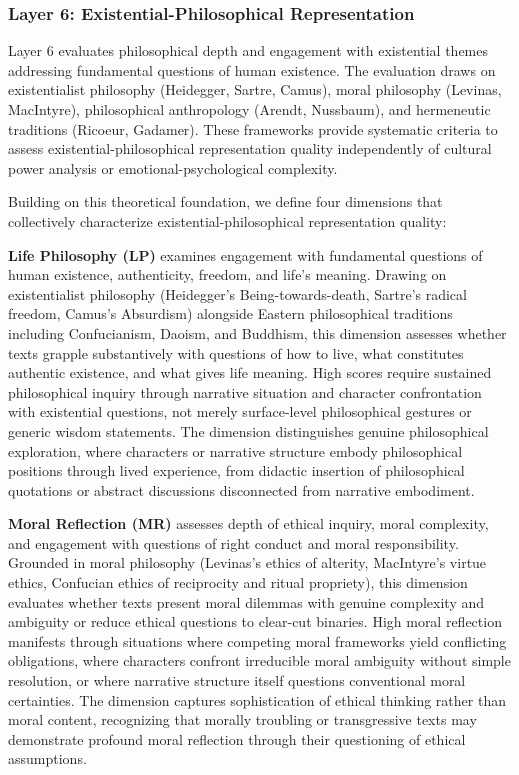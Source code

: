 \subsubsection{Layer 6: Existential-Philosophical Representation}

Layer 6 evaluates philosophical depth and engagement with existential themes addressing fundamental questions of human existence. The evaluation draws on existentialist philosophy (Heidegger, Sartre, Camus), moral philosophy (Levinas, MacIntyre), philosophical anthropology (Arendt, Nussbaum), and hermeneutic traditions (Ricoeur, Gadamer). These frameworks provide systematic criteria to assess existential-philosophical representation quality independently of cultural power analysis or emotional-psychological complexity.

Building on this theoretical foundation, we define four dimensions that collectively characterize existential-philosophical representation quality:

\textbf{Life Philosophy (LP)} examines engagement with fundamental questions of human existence, authenticity, freedom, and life's meaning. Drawing on existentialist philosophy (Heidegger's Being-towards-death, Sartre's radical freedom, Camus's Absurdism) alongside Eastern philosophical traditions including Confucianism, Daoism, and Buddhism, this dimension assesses whether texts grapple substantively with questions of how to live, what constitutes authentic existence, and what gives life meaning. High scores require sustained philosophical inquiry through narrative situation and character confrontation with existential questions, not merely surface-level philosophical gestures or generic wisdom statements. The dimension distinguishes genuine philosophical exploration, where characters or narrative structure embody philosophical positions through lived experience, from didactic insertion of philosophical quotations or abstract discussions disconnected from narrative embodiment.

\textbf{Moral Reflection (MR)} assesses depth of ethical inquiry, moral complexity, and engagement with questions of right conduct and moral responsibility. Grounded in moral philosophy (Levinas's ethics of alterity, MacIntyre's virtue ethics, Confucian ethics of reciprocity and ritual propriety), this dimension evaluates whether texts present moral dilemmas with genuine complexity and ambiguity or reduce ethical questions to clear-cut binaries. High moral reflection manifests through situations where competing moral frameworks yield conflicting obligations, where characters confront irreducible moral ambiguity without simple resolution, or where narrative structure itself questions conventional moral certainties. The dimension captures sophistication of ethical thinking rather than moral content, recognizing that morally troubling or transgressive texts may demonstrate profound moral reflection through their questioning of ethical assumptions.

